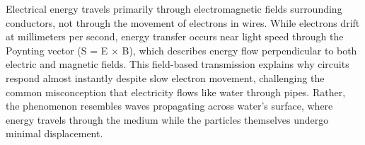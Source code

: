 Electrical energy travels primarily through electromagnetic fields surrounding conductors, not through the movement of electrons in wires. While electrons drift at millimeters per second, energy transfer occurs near light speed through the Poynting vector (S = E × B), which describes energy flow perpendicular to both electric and magnetic fields. This field-based transmission explains why circuits respond almost instantly despite slow electron movement, challenging the common misconception that electricity flows like water through pipes. Rather, the phenomenon resembles waves propagating across water's surface, where energy travels through the medium while the particles themselves undergo minimal displacement.
